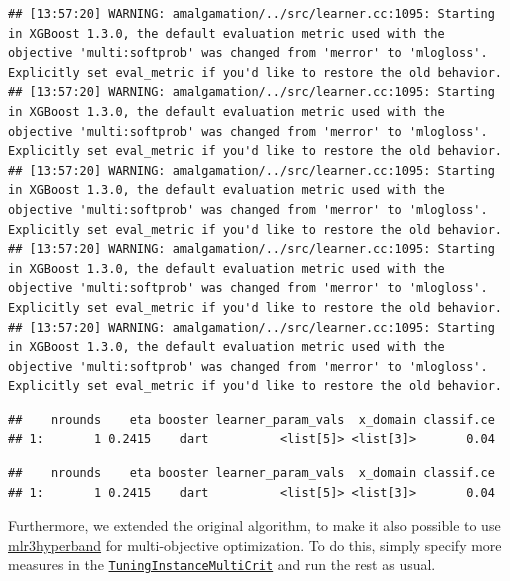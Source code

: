 \documentclass[
]{scrbook}
\newenvironment{Shaded}{\begin{snugshade}}{\end{snugshade}}
\newcommand{\NormalTok}[1]{#1}
\newcommand{\SpecialCharTok}[1]{\textcolor[rgb]{0.00,0.00,0.00}{#1}}
\renewenvironment{Shaded} {\begin{snugshade}\small} {\end{snugshade}}
\begin{document}
\begin{verbatim}
## [13:57:20] WARNING: amalgamation/../src/learner.cc:1095: Starting in XGBoost 1.3.0, the default evaluation metric used with the objective 'multi:softprob' was changed from 'merror' to 'mlogloss'. Explicitly set eval_metric if you'd like to restore the old behavior.
## [13:57:20] WARNING: amalgamation/../src/learner.cc:1095: Starting in XGBoost 1.3.0, the default evaluation metric used with the objective 'multi:softprob' was changed from 'merror' to 'mlogloss'. Explicitly set eval_metric if you'd like to restore the old behavior.
## [13:57:20] WARNING: amalgamation/../src/learner.cc:1095: Starting in XGBoost 1.3.0, the default evaluation metric used with the objective 'multi:softprob' was changed from 'merror' to 'mlogloss'. Explicitly set eval_metric if you'd like to restore the old behavior.
## [13:57:20] WARNING: amalgamation/../src/learner.cc:1095: Starting in XGBoost 1.3.0, the default evaluation metric used with the objective 'multi:softprob' was changed from 'merror' to 'mlogloss'. Explicitly set eval_metric if you'd like to restore the old behavior.
## [13:57:20] WARNING: amalgamation/../src/learner.cc:1095: Starting in XGBoost 1.3.0, the default evaluation metric used with the objective 'multi:softprob' was changed from 'merror' to 'mlogloss'. Explicitly set eval_metric if you'd like to restore the old behavior.
\end{verbatim}

\begin{verbatim}
##    nrounds    eta booster learner_param_vals  x_domain classif.ce
## 1:       1 0.2415    dart          <list[5]> <list[3]>       0.04
\end{verbatim}

\begin{Shaded}
\end{Shaded}

\begin{verbatim}
##    nrounds    eta booster learner_param_vals  x_domain classif.ce
## 1:       1 0.2415    dart          <list[5]> <list[3]>       0.04
\end{verbatim}

Furthermore, we extended the original algorithm, to make it also possible to use \href{https://mlr3hyperband.mlr-org.com}{mlr3hyperband} for multi-objective optimization.
To do this, simply specify more measures in the \href{https://mlr3tuning.mlr-org.com/reference/TuningInstanceMultiCrit.html}{\texttt{TuningInstanceMultiCrit}} and run the rest as usual.
\end{document}

